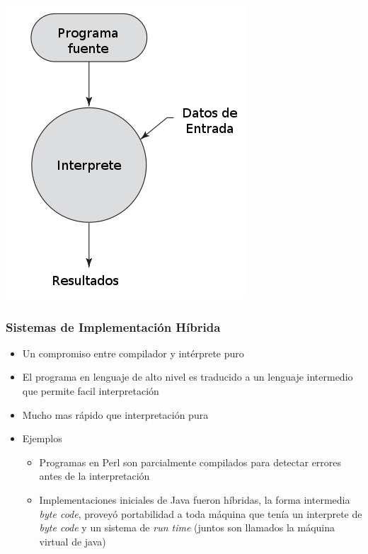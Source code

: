 \documentclass[11pt]{article}
\begin{document}
\includegraphics[width=.9\linewidth]{procesointerppuro.png}

\subsubsection*{Sistemas de Implementación Híbrida}
\label{sec:orgheadline23}
\begin{itemize}
\item Un compromiso entre compilador y intérprete puro
\item El programa en lenguaje de alto nivel es traducido a un lenguaje
intermedio que permite facil interpretación
\item Mucho mas rápido que interpretación pura
\item Ejemplos
\begin{itemize}
\item Programas en Perl son parcialmente compilados para detectar
errores antes de la interpretación
\item Implementaciones iniciales de Java fueron híbridas, la forma
intermedia \emph{byte code}, proveyó portabilidad a toda máquina que
tenía un interprete de \emph{byte code} y un sistema de \emph{run time}
(juntos son llamados la máquina virtual de java)
\end{itemize}
\end{itemize}
\end{document}
